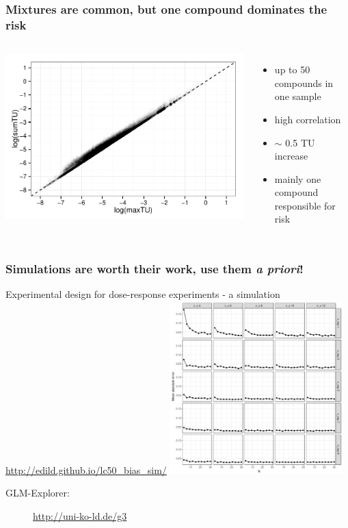 \documentclass[
	10pt
	]{beamer}
\begin{document}
\begin{frame}
\frametitle{Mixtures are common, but one compound dominates the risk}
	\begin{columns}
	    	\vspace{0.5cm}
	    	\includegraphics[width=\textwidth, keepaspectratio]{figs/tusum_tumax.pdf}
	        \begin{itemize}
	        	\item up to 50 compounds in one sample
	        	\item high correlation
	        	\item $\sim$ 0.5 TU increase 
	        	\item mainly one compound responsible for risk
	        \end{itemize}
	\end{columns}
\end{frame}



\begin{frame}
\frametitle{Simulations are worth their work, use them \emph{a priori}!}
	Experimental design for dose-response experiments - a simulation \\
	\url{http://edild.github.io/lc50_bias_sim/}
		    	\includegraphics[width=0.5\textwidth, keepaspectratio]{figs/sim_drm.png} \\
	\begin{description}
		\item[GLM-Explorer:]{\url{http://uni-ko-ld.de/g3}}
	\end{description}
\end{frame}
\end{document}
